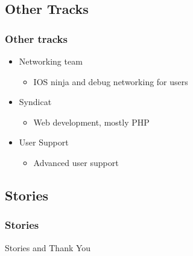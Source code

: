 \documentclass{beamer}
\begin{document}
\subsection{Other Tracks}
\frame
{
    \frametitle{Other tracks}
    \begin{itemize}
      \item Networking team
    \begin{itemize}
      \item IOS ninja and debug networking for users
    \end{itemize}
      \item Syndicat
    \begin{itemize}
      \item Web development, mostly PHP
    \end{itemize}
      \item User Support
    \begin{itemize}
      \item Advanced user support
    \end{itemize}
    \end{itemize}
}

\subsection{Stories}
\frame
{
    \frametitle{Stories}
    Stories and Thank You
}
\end{document}
